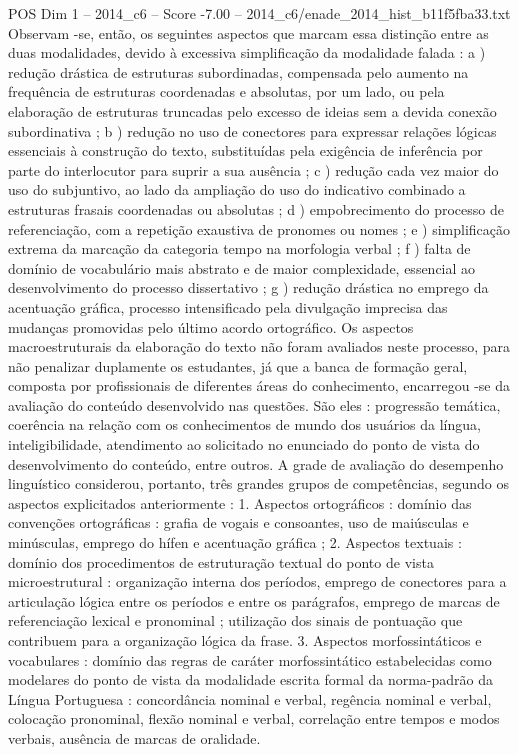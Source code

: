 \begin{textsample}{POS Dim 1 – 2014\_c6 – Score -7.00 – 2014\_c6/enade\_2014\_hist\_b11f5fba33.txt}
Observam -se, então, os seguintes aspectos que marcam essa distinção entre as duas modalidades, devido à excessiva simplificação da modalidade falada : a ) redução drástica de estruturas subordinadas, compensada pelo aumento na frequência de estruturas coordenadas e absolutas, por um lado, ou pela elaboração de estruturas truncadas pelo excesso de ideias sem a devida conexão subordinativa ; b ) redução no uso de conectores para expressar relações lógicas essenciais à construção do texto, substituídas pela exigência de inferência por parte do interlocutor para suprir a sua ausência ; c ) redução cada vez maior do uso do subjuntivo, ao lado da ampliação do uso do indicativo combinado a estruturas frasais coordenadas ou absolutas ; d ) empobrecimento do processo de referenciação, com a repetição exaustiva de pronomes ou nomes ; e ) simplificação extrema da marcação da categoria tempo na morfologia verbal ; f ) falta de domínio de vocabulário mais abstrato e de maior complexidade, essencial ao desenvolvimento do processo dissertativo ; g ) redução drástica no emprego da acentuação gráfica, processo intensificado pela divulgação imprecisa das mudanças promovidas pelo último acordo ortográfico.
Os aspectos macroestruturais da elaboração do texto não foram avaliados neste processo, para não penalizar duplamente os estudantes, já que a banca de formação geral, composta por profissionais de diferentes áreas do conhecimento, encarregou -se da avaliação do conteúdo desenvolvido nas questões.
São eles : progressão temática, coerência na relação com os conhecimentos de mundo dos usuários da língua, inteligibilidade, atendimento ao solicitado no enunciado do ponto de vista do desenvolvimento do conteúdo, entre outros.
A grade de avaliação do desempenho linguístico considerou, portanto, três grandes grupos de competências, segundo os aspectos explicitados anteriormente : 1.
Aspectos ortográficos : domínio das convenções ortográficas : grafia de vogais e consoantes, uso de maiúsculas e minúsculas, emprego do hífen e acentuação gráfica ; 2.
Aspectos textuais : domínio dos procedimentos de estruturação textual do ponto de vista microestrutural : organização interna dos períodos, emprego de conectores para a articulação lógica entre os períodos e entre os parágrafos, emprego de marcas de referenciação lexical e pronominal ; utilização dos sinais de pontuação que contribuem para a organização lógica da frase. 3.
Aspectos morfossintáticos e vocabulares : domínio das regras de caráter morfossintático estabelecidas como modelares do ponto de vista da modalidade escrita formal da norma-padrão da Língua Portuguesa : concordância nominal e verbal, regência nominal e verbal, colocação pronominal, flexão nominal e verbal, correlação entre tempos e modos verbais, ausência de marcas de oralidade.

\end{textsample}
